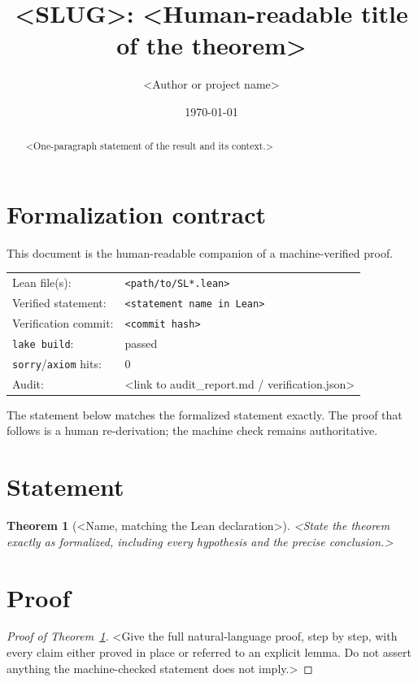 \documentclass{amsart}
\title{<SLUG>: <Human-readable title of the theorem>}
\author{<Author or project name>}
\date{\today}
\newtheorem{theorem}{Theorem}[section]
\theoremstyle{definition}
\begin{document}
\begin{abstract}
<One-paragraph statement of the result and its context.>
\end{abstract}

\maketitle

\section{Formalization contract}
\label{sec:formalization}

This document is the human-readable companion of a machine-verified proof.

\begin{center}
\begin{tabular}{ll}
Lean file(s): & \texttt{<path/to/SL*.lean>}\\
Verified statement: & \texttt{<statement name in Lean>}\\
Verification commit: & \texttt{<commit hash>}\\
\texttt{lake build}: & passed\\
\texttt{sorry}/\texttt{axiom} hits: & 0\\
Audit: & <link to audit_report.md / verification.json>
\end{tabular}
\end{center}

The statement below matches the formalized statement exactly. The proof that
follows is a human re-derivation; the machine check remains authoritative.

\section{Statement}
\label{sec:statement}

\begin{theorem}[<Name, matching the Lean declaration>]
\label{thm:main}
<State the theorem exactly as formalized, including every hypothesis and the
precise conclusion.>
\end{theorem}

\section{Proof}
\label{sec:proof}

\begin{proof}[Proof of Theorem~\ref{thm:main}]
<Give the full natural-language proof, step by step, with every claim either
proved in place or referred to an explicit lemma. Do not assert anything the
machine-checked statement does not imply.>
\end{proof}
\end{document}
